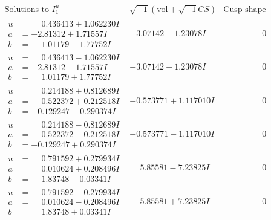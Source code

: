 \documentclass[1p]{elsarticle_modified}
\theoremstyle{definition}
\newcommand{\I}{\sqrt{-1}}
\begin{document}
$$\begin{array}{c|c|c}
\text{Solutions to }I^u_{1}& \I (\text{vol} + \sqrt{-1}CS) & \text{Cusp shape}\\
 \hline 
\begin{aligned}
u &= \phantom{-}0.436413 + 1.062230 I \\
a &= -2.81312 + 1.71557 I \\
b &= \phantom{-}1.01179 - 1.77752 I\end{aligned}
 & -3.07142 + 1.23078 I & \phantom{-0.000000 } 0 \\ \hline\begin{aligned}
u &= \phantom{-}0.436413 - 1.062230 I \\
a &= -2.81312 - 1.71557 I \\
b &= \phantom{-}1.01179 + 1.77752 I\end{aligned}
 & -3.07142 - 1.23078 I & \phantom{-0.000000 } 0 \\ \hline\begin{aligned}
u &= \phantom{-}0.214188 + 0.812689 I \\
a &= \phantom{-}0.522372 + 0.212518 I \\
b &= -0.129247 - 0.290374 I\end{aligned}
 & -0.573771 + 1.117010 I & \phantom{-0.000000 } 0 \\ \hline\begin{aligned}
u &= \phantom{-}0.214188 - 0.812689 I \\
a &= \phantom{-}0.522372 - 0.212518 I \\
b &= -0.129247 + 0.290374 I\end{aligned}
 & -0.573771 - 1.117010 I & \phantom{-0.000000 } 0 \\ \hline\begin{aligned}
u &= \phantom{-}0.791592 + 0.279934 I \\
a &= \phantom{-}0.010624 + 0.208496 I \\
b &= \phantom{-}1.83748 - 0.03341 I\end{aligned}
 & \phantom{-}5.85581 - 7.23825 I & \phantom{-0.000000 } 0 \\ \hline\begin{aligned}
u &= \phantom{-}0.791592 - 0.279934 I \\
a &= \phantom{-}0.010624 - 0.208496 I \\
b &= \phantom{-}1.83748 + 0.03341 I\end{aligned}
 & \phantom{-}5.85581 + 7.23825 I & \phantom{-0.000000 } 0 \\ \hline\begin{aligned}

\end{aligned}
\end{array}$$
\end{document}
